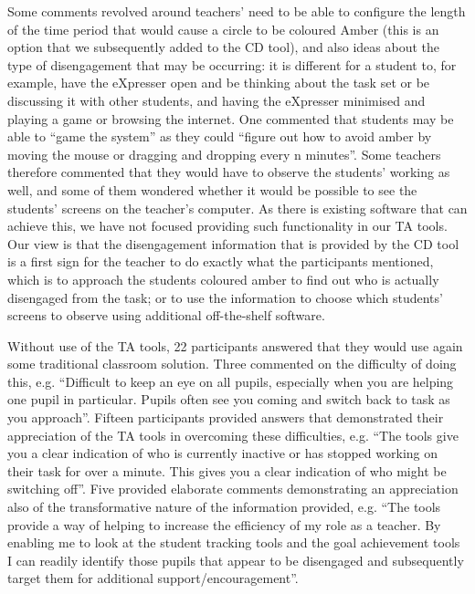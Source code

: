 {{Some comments revolved around
teachers' need to be able to configure the length of the time period 
that would cause a circle to be coloured Amber
(this is an option that we subsequently added to the CD tool), 
and also ideas about the type of
disengagement that may be occurring: it is different for a student to, for example, 
have the eXpresser open and be thinking about the task set or be discussing 
it with other students, and having the eXpresser minimised and playing 
a game or browsing the internet. 
%
%
One commented that students may be able to ``game the system'' as they 
could ``figure out how to avoid amber by moving the mouse or dragging and 
dropping every n minutes''.   
Some teachers therefore commented that they would have
to observe the students' working as well, and some of them 
wondered whether it would be possible to see 
the students' screens on the teacher's computer. 
As there is existing software that can achieve this, we have not focused 
providing such functionality in our TA tools. 
Our view is that the disengagement information that is provided by the CD tool 
is a first sign for the teacher to do exactly what the 
participants mentioned, which is to approach the students coloured amber 
to find out who is actually disengaged from the task; 
or to use the information to choose which students' screens to observe
using additional off-the-shelf software. 

Without use of the TA tools, 22 participants
answered that they would use again some traditional
classroom solution.
Three commented on the difficulty of doing this, e.g. 
``Difficult to keep an eye on all pupils, especially when you are
helping one pupil in particular. Pupils often see you coming and
switch back to task as you approach''. 
Fifteen participants provided answers that demonstrated their appreciation of the 
TA tools in overcoming these difficulties, e.g. ``The tools give you a clear
indication of who is currently inactive or has stopped working on
their task for over a minute. This gives you a clear indication of who
might be switching off''. 
Five provided elaborate comments
demonstrating an appreciation also of the transformative nature
of the information provided, e.g. ``The tools provide a way of helping to
increase the efficiency of my role as a teacher. By enabling me to
look at the student tracking tools and the goal achievement tools I
can readily identify those pupils that appear to be disengaged and
subsequently target them for additional support/encouragement''. 



}}
